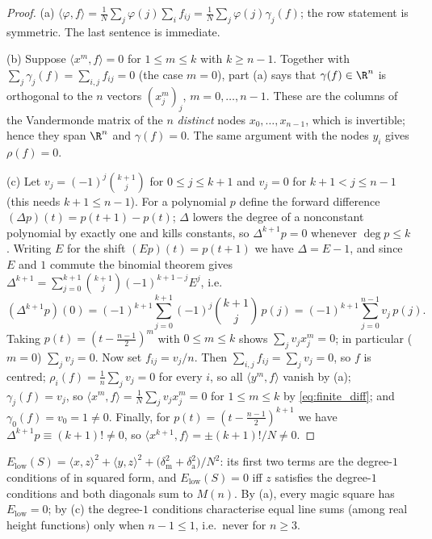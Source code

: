 \begin{proof}
(a) $\langle\varphi,f\rangle=\frac1N\sum_j\varphi(j)\sum_i f_{ij}=\frac1N\sum_j\varphi(j)\gamma_j(f)$; the row statement is symmetric.
The last sentence is immediate.

(b) Suppose $\langle x^{m},f\rangle=0$ for $1\le m\le k$ with $k\ge n-1$.  Together with
$\sum_j\gamma_j(f)=\sum_{i,j}f_{ij}=0$ (the case $m=0$), part (a) says that $\gamma(f)\in\R^{n}$ is orthogonal to the
$n$ vectors $(x_j^{m})_{j}$, $m=0,\dots,n-1$.  These are the columns of the Vandermonde matrix of the $n$
\emph{distinct} nodes $x_0,\dots,x_{n-1}$, which is invertible; hence they span $\R^{n}$ and $\gamma(f)=0$.
The same argument with the nodes $y_i$ gives $\rho(f)=0$.

(c) Let $v_j=(-1)^{j}\binom{k+1}{j}$ for $0\le j\le k+1$ and $v_j=0$ for $k+1<j\le n-1$ (this needs
$k+1\le n-1$).  For a polynomial $p$ define the forward difference $(\Delta p)(t)=p(t+1)-p(t)$; $\Delta$
lowers the degree of a nonconstant polynomial by exactly one and kills constants, so $\Delta^{k+1}p=0$ whenever
$\deg p\le k$.  Writing $E$ for the shift $(Ep)(t)=p(t+1)$ we have $\Delta=E-1$, and since $E$ and $1$ commute
the binomial theorem gives $\Delta^{k+1}=\sum_{j=0}^{k+1}\binom{k+1}{j}(-1)^{k+1-j}E^{j}$, i.e.
\begin{equation}
(\Delta^{k+1}p)(0)=(-1)^{k+1}\sum_{j=0}^{k+1}(-1)^{j}\binom{k+1}{j}\,p(j)=(-1)^{k+1}\sum_{j=0}^{n-1}v_j\,p(j).
\label{eq:finite_diff}
\end{equation}
Taking $p(t)=(t-\frac{n-1}2)^{m}$ with $0\le m\le k$ shows $\sum_j v_jx_j^{m}=0$; in particular ($m=0$)
$\sum_jv_j=0$.  Now set $f_{ij}=v_j/n$.  Then $\sum_{i,j}f_{ij}=\sum_jv_j=0$, so $f$ is centred;
$\rho_i(f)=\frac1n\sum_jv_j=0$ for every $i$, so all $\langle y^{m},f\rangle$ vanish by (a);
$\gamma_j(f)=v_j$, so $\langle x^{m},f\rangle=\frac1N\sum_jv_jx_j^{m}=0$ for $1\le m\le k$ by \eqref{eq:finite_diff};
and $\gamma_0(f)=v_0=1\ne0$.  Finally, for $p(t)=(t-\frac{n-1}2)^{k+1}$ we have $\Delta^{k+1}p\equiv(k+1)!\ne0$,
so $\langle x^{k+1},f\rangle=\pm(k+1)!/N\ne0$.
\end{proof}

\begin{corollary}
\label{cor:Elow_degree1}
$E_{\mathrm{low}}(S)=\langle x,z\rangle^{2}+\langle y,z\rangle^{2}+\bigl(\delta_{\mathrm m}^{2}+\delta_{\mathrm a}^{2}\bigr)/N^{2}$:
its first two terms are the degree-$1$ conditions of  in squared form, and
$E_{\mathrm{low}}(S)=0$ iff $z$ satisfies the degree-$1$ conditions and both diagonals sum to $M(n)$.
By (a), every magic square has $E_{\mathrm{low}}=0$; by (c) the degree-$1$
conditions characterise equal line sums (among real height functions) only when $n-1\le1$, i.e.\ never for $n\ge3$.
\end{corollary}

